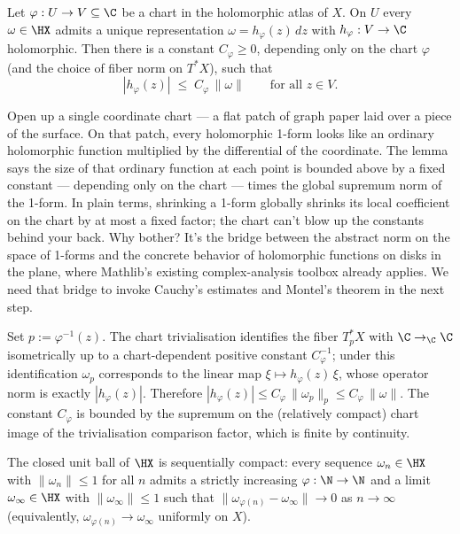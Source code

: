 \begin{lemma}
\label{lem:chart-coefficient-bound}
Let \(\varphi:U\to V\subseteq\C\) be a chart in the holomorphic atlas
of \(X\). On \(U\) every \(\omega\in\HX\) admits a unique
representation \(\omega = h_{\varphi}(z)\,dz\) with
\(h_{\varphi} : V \to \C\) holomorphic. Then there is a constant
\(C_{\varphi}\ge 0\), depending only on the chart \(\varphi\) (and the
choice of fiber norm on \(T^{*}X\)), such that
\[
  |h_{\varphi}(z)| \;\le\; C_{\varphi}\,\|\omega\|
  \qquad\text{for all } z \in V.
\]
\leanok
\end{lemma}

\begin{layman}
Open up a single coordinate chart — a flat patch of graph paper laid over
a piece of the surface. On that patch, every holomorphic 1-form looks
like an ordinary holomorphic function multiplied by the differential of
the coordinate. The lemma says the size of that ordinary function at
each point is bounded above by a fixed constant — depending only on the
chart — times the global supremum norm of the 1-form. In plain terms,
shrinking a 1-form globally shrinks its local coefficient on the chart
by at most a fixed factor; the chart can't blow up the constants behind
your back. Why bother? It's the bridge between the abstract norm on the
space of 1-forms and the concrete behavior of holomorphic functions on
disks in the plane, where Mathlib's existing complex-analysis toolbox
already applies. We need that bridge to invoke Cauchy's estimates and
Montel's theorem in the next step.
\end{layman}

\begin{proofsketch}
Set \(p := \varphi^{-1}(z)\). The chart trivialisation identifies the
fiber \(T^{*}_{p}X\) with \(\C \to_{\C} \C\) isometrically up to a
chart-dependent positive constant \(C_{\varphi}^{-1}\); under this
identification \(\omega_{p}\) corresponds to the linear map
\(\xi\mapsto h_{\varphi}(z)\,\xi\), whose operator norm is exactly
\(|h_{\varphi}(z)|\). Therefore
\(|h_{\varphi}(z)| \le C_{\varphi}\,\|\omega_{p}\|_{p} \le
C_{\varphi}\,\|\omega\|\). The constant \(C_{\varphi}\) is bounded by
the supremum on the (relatively compact) chart image of the
trivialisation comparison factor, which is finite by continuity.
\end{proofsketch}

\begin{lemma}
\label{lem:montel-compactness}
The closed unit ball of \(\HX\) is sequentially compact: every sequence
\(\omega_n\in\HX\) with \(\|\omega_n\|\le 1\) for all \(n\) admits a
strictly increasing \(\varphi:\N\to\N\) and a limit
\(\omega_\infty\in\HX\) with \(\|\omega_\infty\|\le 1\) such that
\(\|\omega_{\varphi(n)} - \omega_\infty\| \to 0\) as \(n\to\infty\)
(equivalently, \(\omega_{\varphi(n)} \to \omega_\infty\) uniformly on
\(X\)).
\leanok
\end{lemma}

